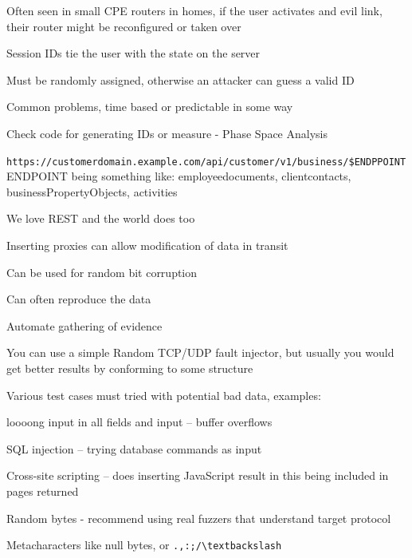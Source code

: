 \documentclass[Screen16to9,17pt]{foils}
\begin{document}
\begin{list2}
  \item Often seen in small CPE routers in homes, if the user activates and evil link, their router might be reconfigured or taken over
\end{list2}


\begin{list2}
\item Session IDs tie the user with the state on the server
\item Must be randomly assigned, otherwise an attacker can guess a valid ID
\item Common problems, time based or predictable in some way
\item Check code for generating IDs or measure - Phase Space Analysis
\end{list2}


\verb+https://customerdomain.example.com/api/customer/v1/business/$ENDPPOINT+\\
ENDPOINT being something like: employeedocuments, clientcontacts, businessPropertyObjects, activities

\begin{list2}
\item    We love REST and the world does too
\end{list2}


\begin{list1}
\item Inserting proxies can allow modification of data in transit
\item Can be used for random bit corruption
\item Can often reproduce the data
\item Automate gathering of evidence
\item You can use a simple Random TCP/UDP fault injector, but usually you would get better results by conforming to some structure
\item Various test cases must tried with potential bad data, examples:
\begin{list2}
\item loooong input in all fields and input -- buffer overflows
\item SQL injection -- trying database commands as input
\item Cross-site scripting -- does inserting JavaScript result in this being included in pages returned
\item Random bytes - recommend using real fuzzers that understand target protocol
\item Metacharacters like null bytes, or \verb+.,:;/\textbackslash+
\end{list2}
\end{list1}
\end{document}
